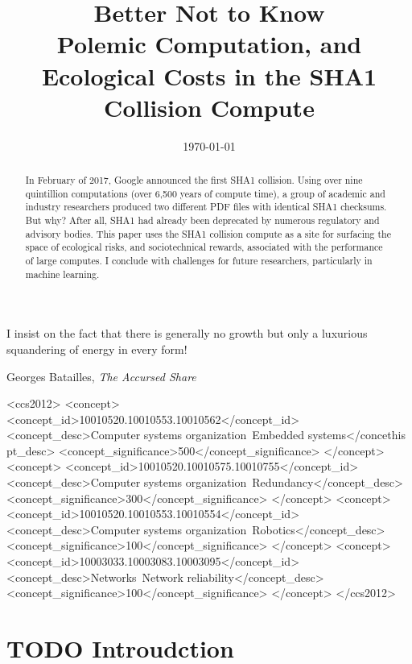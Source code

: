 \documentclass[sigconf]{acmart}
\date{\today}
\title{Better Not to Know\\\medskip
\large Polemic Computation, and Ecological Costs in the SHA1 Collision Compute}
\begin{document}
\maketitle

\epigraph{I insist on the fact that there is generally no growth but only a luxurious squandering of energy in every form!}{Georges Batailles, \textit{The Accursed Share}}

\begin{abstract}
In February of 2017, Google announced the first SHA1 collision. 
Using over nine quintillion computations (over 6,500 years of compute time), a group of academic and industry researchers produced two different PDF files with identical SHA1 checksums. 
But why? After all, SHA1 had already been deprecated by numerous regulatory and advisory bodies. 
This paper uses the SHA1 collision compute as a site 
for surfacing the space of ecological risks, and sociotechnical rewards,
associated with the performance of large computes.
I conclude with challenges for future researchers, particularly in machine learning.
\end{abstract}

\begin{CCSXML}
<ccs2012>
 <concept>
  <concept_id>10010520.10010553.10010562</concept_id>
  <concept_desc>Computer systems organization~Embedded systems</concethis pt_desc>
  <concept_significance>500</concept_significance>
 </concept>
 <concept>
  <concept_id>10010520.10010575.10010755</concept_id>
  <concept_desc>Computer systems organization~Redundancy</concept_desc>
  <concept_significance>300</concept_significance>
 </concept>
 <concept>
  <concept_id>10010520.10010553.10010554</concept_id>
  <concept_desc>Computer systems organization~Robotics</concept_desc>
  <concept_significance>100</concept_significance>
 </concept>
 <concept>
  <concept_id>10003033.10003083.10003095</concept_id>
  <concept_desc>Networks~Network reliability</concept_desc>
  <concept_significance>100</concept_significance>
 </concept>
</ccs2012>  
\end{CCSXML}




\section{{\bfseries\sffamily TODO} Introudction}
\label{sec:orgd7ae10b}
\end{document}
